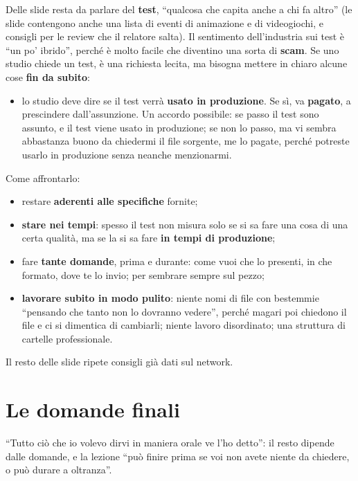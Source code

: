 Delle slide resta da parlare del \textbf{test}, ``qualcosa che capita anche a
chi fa altro'' (le slide contengono anche una lista di eventi di animazione e
di videogiochi, e consigli per le review che il relatore salta). Il sentimento
dell'industria sui test è ``un po' ibrido'', perché è molto facile che
diventino una sorta di \textbf{scam}. Se uno studio chiede un test, è una
richiesta lecita, ma bisogna mettere in chiaro alcune cose \textbf{fin da
subito}:
\begin{itemize}
  \item lo studio deve dire se il test verrà \textbf{usato in produzione}. Se
        sì, va \textbf{pagato}, a prescindere dall'assunzione. Un accordo
        possibile: se passo il test sono assunto, e il test viene usato in
        produzione; se non lo passo, ma vi sembra abbastanza buono da
        chiedermi il file sorgente, me lo pagate, perché potreste usarlo in
        produzione senza neanche menzionarmi.
\end{itemize}
Come affrontarlo:
\begin{itemize}
  \item restare \textbf{aderenti alle specifiche} fornite;
  \item \textbf{stare nei tempi}: spesso il test non misura solo se si sa fare
        una cosa di una certa qualità, ma se la si sa fare \textbf{in tempi di
        produzione};
  \item fare \textbf{tante domande}, prima e durante: come vuoi che lo
        presenti, in che formato, dove te lo invio; per sembrare sempre sul
        pezzo;
  \item \textbf{lavorare subito in modo pulito}: niente nomi di file con
        bestemmie ``pensando che tanto non lo dovranno vedere'', perché magari
        poi chiedono il file e ci si dimentica di cambiarli; niente lavoro
        disordinato; una struttura di cartelle professionale.
\end{itemize}
Il resto delle slide ripete consigli già dati sul network.

\section{Le domande finali}
\label{p4:sec:domande}

``Tutto ciò che io volevo dirvi in maniera orale ve l'ho detto'': il resto
dipende dalle domande, e la lezione ``può finire prima se voi non avete niente
da chiedere, o può durare a oltranza''.

